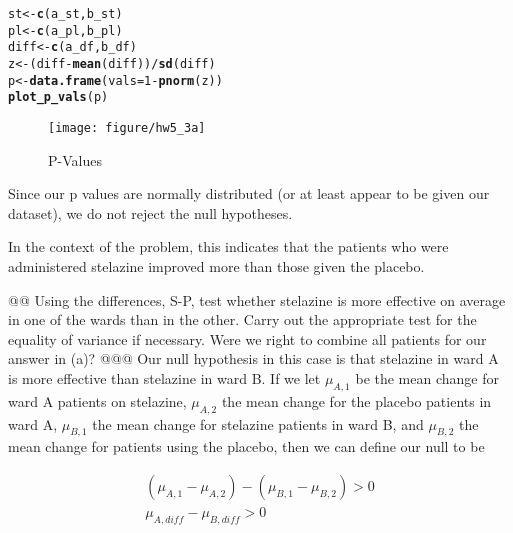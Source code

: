 \documentclass[10pt]{article}\usepackage[]{graphicx}\usepackage[]{xcolor}
\makeatletter
\def\maxwidth{ %
  \ifdim\Gin@nat@width>\linewidth
    \linewidth
  \else
    \Gin@nat@width
  \fi
}
\newcommand{\hlnum}[1]{\textcolor[rgb]{0.686,0.059,0.569}{#1}}%
\newcommand{\hlopt}[1]{\textcolor[rgb]{0,0,0}{#1}}%
\newcommand{\hlstd}[1]{\textcolor[rgb]{0.345,0.345,0.345}{#1}}%
\newcommand{\hlkwb}[1]{\textcolor[rgb]{0.69,0.353,0.396}{#1}}%
\newcommand{\hlkwc}[1]{\textcolor[rgb]{0.333,0.667,0.333}{#1}}%
\newcommand{\hlkwd}[1]{\textcolor[rgb]{0.737,0.353,0.396}{\textbf{#1}}}%
\newenvironment{kframe}{%
 \def\at@end@of@kframe{}%
 \ifinner\ifhmode%
  \def\at@end@of@kframe{\end{minipage}}%
  \begin{minipage}{\columnwidth}%
 \fi\fi%
 \def\FrameCommand##1{\hskip\@totalleftmargin \hskip-\fboxsep
 \colorbox{shadecolor}{##1}\hskip-\fboxsep
     \hskip-\linewidth \hskip-\@totalleftmargin \hskip\columnwidth}%
 \MakeFramed {\advance\hsize-\width
   \@totalleftmargin\z@ \linewidth\hsize
   \@setminipage}}%
 {\par\unskip\endMakeFramed%
 \at@end@of@kframe}
\newenvironment{knitrout}{}{} %
\makeatother
\begin{document}
\begin{easylist}[enumerate]
\begin{knitrout}
\color{fgcolor}\begin{kframe}
\begin{alltt}
             \hlstd{st} \hlkwb{<-} \hlkwd{c}\hlstd{(a_st, b_st)}
             \hlstd{pl} \hlkwb{<-} \hlkwd{c}\hlstd{(a_pl, b_pl)}
             \hlstd{diff} \hlkwb{<-} \hlkwd{c}\hlstd{(a_df, b_df)}
             \hlstd{z} \hlkwb{<-} \hlstd{(diff} \hlopt{-} \hlkwd{mean}\hlstd{(diff))} \hlopt{/} \hlkwd{sd}\hlstd{(diff)}
             \hlstd{p} \hlkwb{<-} \hlkwd{data.frame}\hlstd{(}\hlkwc{vals}\hlstd{=}\hlnum{1} \hlopt{-} \hlkwd{pnorm}\hlstd{(z))}
             \hlkwd{plot_p_vals}\hlstd{(p)}
\end{alltt}
\end{kframe}\begin{figure}[H]


{\centering \texttt{[image: figure/hw5\_3a]} 

}

\caption[P-Values]{P-Values\label{fig:hw5.3a}}
\end{figure}


\end{knitrout}


    Since our p values are normally distributed (or at least appear to be given our dataset), we do not reject the null
    hypotheses.\newline

    In the context of the problem, this indicates that the patients who were administered stelazine improved more than
    those given the placebo.

    @@ Using the differences, S-P, test whether stelazine is more effective on average in one of the wards than in the
    other. Carry out the appropriate test for the equality of variance if necessary. Were we right to combine all
    patients for our answer in (a)?
    @@@ Our null hypothesis in this case is that stelazine in ward A is more effective than stelazine in ward B. If we
    let $\mu_{A,1}$ be the mean change for ward A patients on stelazine, $\mu_{A,2}$ the mean change for the placebo
    patients in ward A, $\mu_{B,1}$ the mean change for stelazine patients in ward B, and $\mu_{B,2}$ the mean change
    for patients using the placebo, then we can define our null to be

    \[
        \begin{aligned}
            ( \mu_{A,1} - \mu_{A,2} ) - ( \mu_{B,1} - \mu_{B,2} ) > 0\\
            \mu_{A,diff} - \mu_{B,diff} > 0
        \end{aligned}
    \]


\end{easylist}
\end{document}

